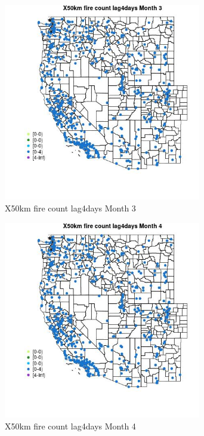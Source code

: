 \begin{figure} 
\centering  
\includegraphics[width=0.77\textwidth]{Code_Outputs/Report_ML_input_PM25_Step4_part_e_de_duplicated_aves_compiled_2019-05-14wNAs_MapObsMo3X50km_fire_count_lag4days.jpg} 
\caption{\label{fig:Report_ML_input_PM25_Step4_part_e_de_duplicated_aves_compiled_2019-05-14wNAsMapObsMo3X50km_fire_count_lag4days}X50km fire count lag4days Month 3} 
\end{figure} 
 

\begin{figure} 
\centering  
\includegraphics[width=0.77\textwidth]{Code_Outputs/Report_ML_input_PM25_Step4_part_e_de_duplicated_aves_compiled_2019-05-14wNAs_MapObsMo4X50km_fire_count_lag4days.jpg} 
\caption{\label{fig:Report_ML_input_PM25_Step4_part_e_de_duplicated_aves_compiled_2019-05-14wNAsMapObsMo4X50km_fire_count_lag4days}X50km fire count lag4days Month 4} 
\end{figure} 
 

